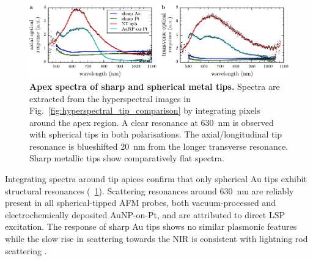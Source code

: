 \documentclass{article}
\begin{document}
\begin{figure}[bt]
\centering
\includegraphics{figures/apex_spectra_comparison}
\caption[Apex spectra of sharp and spherical metal tips]{\textbf{Apex spectra of sharp and spherical metal tips.} Spectra are extracted from the hyperspectral images in Fig.~\ref{fig:hyperspectral_tip_comparison} by integrating pixels around the apex region. A clear resonance at \SI{630}{nm} is observed with spherical tips in both polarisations. The axial/longitudinal tip resonance is blueshifted \SI{20}{nm} from the longer transverse resonance. Sharp metallic tips show comparatively flat spectra.}
\label{fig:apex_spectra}
\vspace{-5pt}
\end{figure}

Integrating spectra around tip apices confirm that only spherical Au tips exhibit structural resonances (\figurename~\ref{fig:apex_spectra}). Scattering resonances around \SI{630}{nm} are reliably present in all spherical-tipped AFM probes, both vacuum-processed and electrochemically deposited AuNP-on-Pt, and are attributed to direct LSP excitation. The response of sharp Au tips shows no similar plasmonic features while the slow rise in scattering towards the NIR is consistent with lightning rod scattering \cite{zhang2009}.
\end{document}
